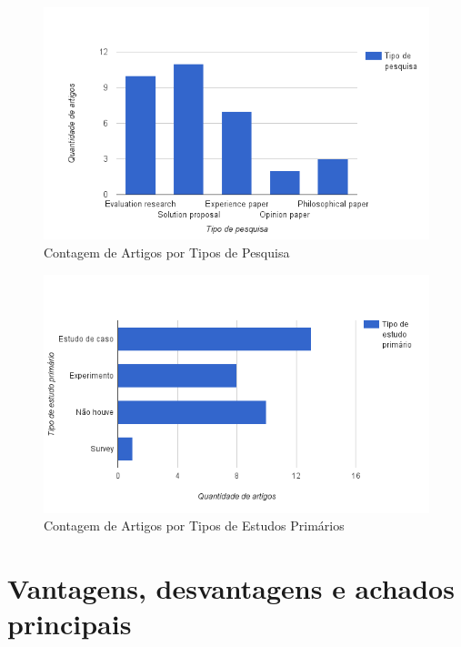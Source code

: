  
 \begin{figure}[h!]
 \centering
 \includegraphics[scale=0.5]{tipo_de_pesquisa.png}
 \caption{\label{fig:tipo_de_pesquisa}Contagem de Artigos por Tipos de Pesquisa}
\end{figure}
 
 
 \begin{figure}[h!]
 \centering
 \includegraphics[scale=0.5]{tipo_de_estudo_primario.png}
 \caption{\label{fig:tipo_de_estudo_primario}Contagem de Artigos por Tipos de
 Estudos Primários}
\end{figure}
 \FloatBarrier
 
 \section{Vantagens, desvantagens e achados principais}
 
